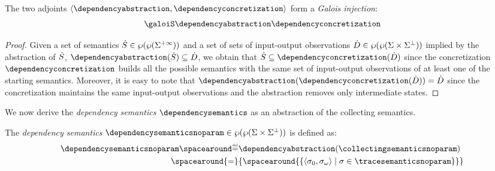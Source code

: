 \begin{theorem}
The two adjoints $\tuple{\dependencyabstraction}{\dependencyconcretization}$ form a \emph{Galois injection}:
\begin{align*}
  \galoisinjbetweensemantics{collecting}{dependency}
\end{align*}
\end{theorem}
\begin{proof}
  Given a set of semantics $\dot{S}\in\wp(\wp(\Sigma^{+\infty}))$ and a set of sets of input-output observations $\dot{D}\in\wp(\wp(\Sigma\times\Sigma^\bot))$ implied by the abstraction of $\dot{S}$, $\dependencyabstraction(\defsetofsetoftraces)\subseteq \defsetofsetofdependencies$, we obtain that $\defsetofsetoftraces\subseteq\dependencyconcretization(\defsetofsetofdependencies)$ since the concretization $\dependencyconcretization$ builds all the possible semantics with the same set of input-output observations of at least one of the starting semantics.
  Moreover, it is easy to note that $\dependencyabstraction(\dependencyconcretization(\defsetofsetofdependencies)) = \defsetofsetofdependencies$ since the concretization maintains the same input-output observations and the abstraction removes only intermediate states.
\end{proof}

We now derive the \emph{dependency semantics} $\dependencysemantics$ as an abstraction of the collecting semantics.

\begin{definition}
  The \emph{dependency semantics} $\dependencysemanticsnoparam\in\dependencytype$ is defined as:
  \begin{align*}
    \dependencysemanticsnoparam\DefeQ& \dependencyabstraction(\collectingsemanticsnoparam) \\
    \spacearound{=}& \{\spacearound{\setdef{\inputoutputtuple{\deftrace}}{\deftrace \in \tracesemanticsnoparam}}\}
  \end{align*}
\end{definition}


